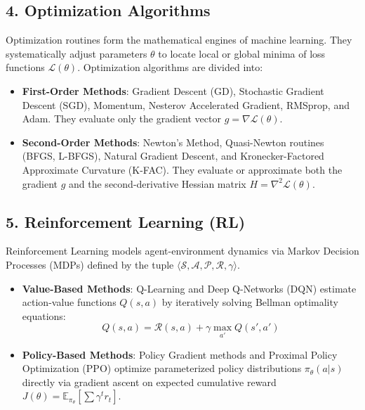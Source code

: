 \subsection{4. Optimization Algorithms}
Optimization routines form the mathematical engines of machine learning. They systematically adjust parameters $\theta$ to locate local or global minima of loss functions $\mathcal{L}(\theta)$. Optimization algorithms are divided into:
\begin{itemize}[leftmargin=*]
    \item \textbf{First-Order Methods}: Gradient Descent (GD), Stochastic Gradient Descent (SGD), Momentum, Nesterov Accelerated Gradient, RMSprop, and Adam. They evaluate only the gradient vector $g = \nabla \mathcal{L}(\theta)$.
    \item \textbf{Second-Order Methods}: Newton's Method, Quasi-Newton routines (BFGS, L-BFGS), Natural Gradient Descent, and Kronecker-Factored Approximate Curvature (K-FAC). They evaluate or approximate both the gradient $g$ and the second-derivative Hessian matrix $H = \nabla^2 \mathcal{L}(\theta)$.
\end{itemize}

\subsection{5. Reinforcement Learning (RL)}
Reinforcement Learning models agent-environment dynamics via Markov Decision Processes (MDPs) defined by the tuple $\langle \mathcal{S}, \mathcal{A}, \mathcal{P}, \mathcal{R}, \gamma \rangle$.
\begin{itemize}[leftmargin=*]
    \item \textbf{Value-Based Methods}: Q-Learning and Deep Q-Networks (DQN) estimate action-value functions $Q(s, a)$ by iteratively solving Bellman optimality equations:
    \begin{equation}
    Q(s, a) = \mathcal{R}(s, a) + \gamma \max_{a'} Q(s', a')
    \end{equation}
    \item \textbf{Policy-Based Methods}: Policy Gradient methods and Proximal Policy Optimization (PPO) optimize parameterized policy distributions $\pi_\theta(a|s)$ directly via gradient ascent on expected cumulative reward $J(\theta) = \mathbb{E}_{\pi_\theta} [\sum \gamma^t r_t]$.
\end{itemize}

